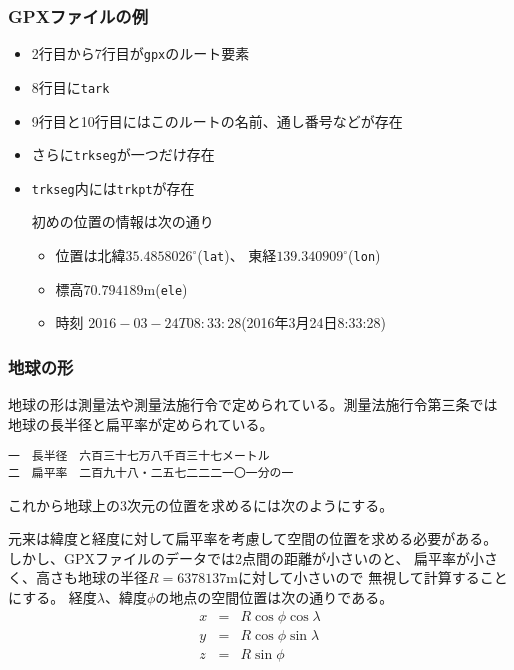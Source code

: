 \subsubsection{GPXファイルの例}
 \begin{itemize}
  \item 2行目から7行目が\texttt{gpx}のルート要素
  \item 8行目に\texttt{tark}
  \item 9行目と10行目にはこのルートの名前、通し番号などが存在
  \item さらに\texttt{trkseg}が一つだけ存在
  \item \texttt{trkseg}内には\texttt{trkpt}が存在

        初めの位置の情報は次の通り
        \begin{itemize}
         \item 位置は北緯$35.4858026^{\circ}$(\texttt{lat})、
               東経$139.340909^{\circ}$(\texttt{lon})
         \item 標高$70.794189\mathrm{m}$(\texttt{ele})
         \item 時刻 $2016-03-24T08:33:28$(2016年3月24日8:33:28)
        \end{itemize}
 \end{itemize}
\subsubsection{地球の形}
地球の形は測量法や測量法施行令で定められている。測量法施行令第三条では
地球の長半径と扁平率が定められている。
\begin{Verbatim}
一　長半径　六百三十七万八千百三十七メートル
二　扁平率　二百九十八・二五七二二二一〇一分の一
\end{Verbatim}
これから地球上の3次元の位置を求めるには次のようにする。

元来は緯度と経度に対して扁平率を考慮して空間の位置を求める必要がある。
しかし、GPXファイルのデータでは2点間の距離が小さいのと、
扁平率が小さく、高さも地球の半径$R=6378137\mathrm{m}$に対して小さいので
 無視して計算することにする。
  経度$\lambda$、緯度$\phi$の地点の空間位置は次の通りである。
				\begin{eqnarray*}
				 x &=& R\cos\phi\cos\lambda\\
				 y &=& R\cos\phi\sin\lambda\\
				 z &=& R\sin\phi
				\end{eqnarray*}
